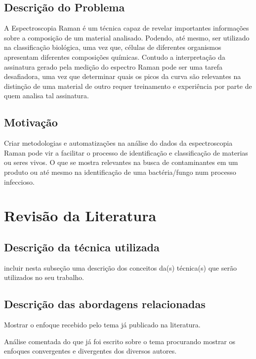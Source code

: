 \documentclass[english]{article}
\begin{document}
\vspace{2cm}
\subsection{Descrição do Problema}
\vspace{1cm} A Espectroscopia Raman é um técnica capaz de revelar importantes informações sobre a composição de um material analisado. Podendo, até mesmo, ser utilizado na classificação biológica, uma vez que, células de diferentes organismos apresentam diferentes composições químicas.
Contudo a interpretação da assinatura gerado pela medição do espectro Raman pode ser uma tarefa desafiadora, uma vez que determinar quais os picos da curva são relevantes na distinção de uma material de outro requer treinamento e experiência por parte de quem analisa tal assinatura.

\subsection{Motivação}
\vspace{1cm} Criar metodologias e automatizações na análise do dados da espectroscopia Raman pode vir a facilitar o processo de identificação e classificação de materias ou seres vivos. O que se mostra relevantes na busca de contaminantes em um produto ou até mesmo na identificação de uma bactéria/fungo num processo infeccioso.

\vspace{2cm}
\section{Revisão da Literatura}
\subsection{Descrição da técnica utilizada}
incluir nesta subseção uma descrição dos conceitos da(s) técnica(s)
que serão utilizados no seu trabalho.

\subsection{Descrição das abordagens relacionadas}
\vspace{1cm} Mostrar o enfoque recebido pelo tema já publicado na
literatura. \vspace{1cm}

Análise comentada do que já foi escrito sobre o tema procurando
mostrar os enfoques convergentes e divergentes dos diversos
autores. \vspace{1cm}
\end{document}
